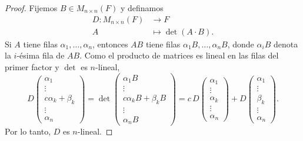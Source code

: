 \documentclass[12pt,a4paper]{book}
\begin{document}
    \begin{proof}
        Fijemos $B \in M_{n \times n}(F)$ y definamos
        \begin{align*}
            D: M_{n \times n}(F) & \longrightarrow F \\
            A & \longmapsto \det(A \cdot B).
        \end{align*}
        Si $A$ tiene filas $\alpha_1, \dots, \alpha_n$, entonces $AB$ tiene filas $\alpha_1 B, \dots, \alpha_n B$, donde $\alpha_i B$ denota la $i$-ésima fila de $AB$. Como el producto de matrices es lineal en las filas del primer factor y $\det$ es $n$-lineal,
        \begin{equation*}
            D
            \begin{pmatrix}
                \alpha_1 \\
                \vdots \\
                c\alpha_k + \beta_k \\
                \vdots \\
                \alpha_n
            \end{pmatrix}
            = \det
            \begin{pmatrix}
                \alpha_1 B \\
                \vdots \\
                c\alpha_k B + \beta_k B \\
                \vdots \\
                \alpha_n B
            \end{pmatrix}
            = c \, D
            \begin{pmatrix}
                \alpha_1 \\
                \vdots \\
                \alpha_k \\
                \vdots \\
                \alpha_n
            \end{pmatrix}
            + D
            \begin{pmatrix}
                \alpha_1 \\
                \vdots \\
                \beta_k \\
                \vdots \\
                \alpha_n
            \end{pmatrix}.
        \end{equation*}
        Por lo tanto, $D$ es $n$-lineal.


\end{proof}
\end{document}
